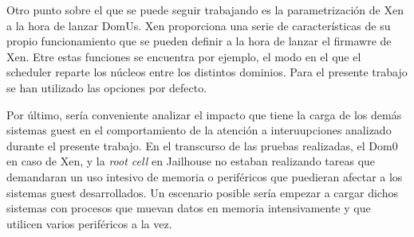 Otro punto sobre el que se puede seguir trabajando es la parametrización de Xen a la hora de lanzar DomUs. Xen proporciona una serie de características de su propio funcionamiento que se pueden definir a la hora de lanzar el firmawre de Xen. Etre estas funciones se encuentra por ejemplo, el modo en el que el scheduler reparte los núcleos entre los distintos dominios. Para el presente trabajo se han utilizado las opciones por defecto.

Por último, sería conveniente analizar el impacto que tiene la carga de los demás sistemas guest en el comportamiento de la atención a interuupciones analizado durante el presente trabajo. En el transcurso de las pruebas realizadas, el Dom0 en caso de Xen, y la \textit{root cell} en Jailhouse no estaban realizando tareas que demandaran un uso intesivo de memoria o periféricos que puedieran afectar a los sistemas guest desarrollados. Un escenario posible sería empezar a cargar dichos sistemas con procesos que muevan datos en memoria intensivamente y que utilicen varios periféricos a la vez. 
